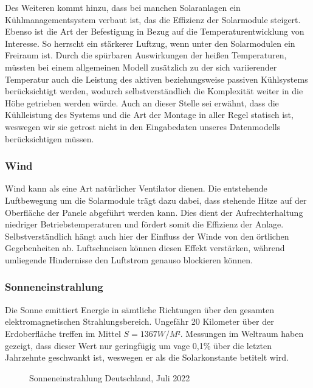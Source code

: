 \documentclass[12pt, a4paper]{article}
\begin{document}
Des Weiteren kommt hinzu, dass bei manchen Solaranlagen ein Kühlmanagementsystem verbaut ist, das die Effizienz der Solarmodule steigert. Ebenso ist die Art der Befestigung in Bezug auf die Temperaturentwicklung von Interesse. So herrscht ein stärkerer Luftzug, wenn unter den Solarmodulen ein Freiraum ist. Durch die spürbaren Auswirkungen der heißen Temperaturen, müssten bei einem allgemeinen Modell zusätzlich zu der sich variierender Temperatur auch die Leistung des aktiven beziehungsweise passiven Kühlsystems berücksichtigt werden, wodurch selbstverständlich die Komplexität weiter in die Höhe getrieben werden würde. Auch an dieser Stelle sei erwähnt, dass die Kühlleistung des Systems und die Art der Montage in aller Regel statisch ist, weswegen wir sie getrost nicht in den Eingabedaten unseres Datenmodells berücksichtigen müssen.

\subsubsection{Wind}

Wind kann als eine Art natürlicher Ventilator dienen. Die entstehende Luftbewegung um die Solarmodule trägt dazu dabei, dass stehende Hitze auf der Oberfläche der Panele abgeführt werden kann. Dies dient der Aufrechterhaltung niedriger Betriebstemperaturen und fördert somit die Effizienz der Anlage. Selbstverständlich hängt auch hier der Einfluss der Winde von den örtlichen Gegebenheiten ab. Luftschneisen können diesen Effekt verstärken, während umliegende Hindernisse den Luftstrom genauso blockieren können.

\subsubsection{Sonneneinstrahlung}

Die Sonne emittiert Energie in sämtliche Richtungen über den gesamten elektromagnetischen Strahlungsbereich. Ungefähr 20 Kilometer über der Erdoberfläche treffen im Mittel $S = 1367 W/M²$. Messungen im Weltraum haben gezeigt, dass dieser Wert nur geringfügig um vage 0,1\% über die letzten Jahrzehnte geschwankt ist, weswegen er als die Solarkonstante betitelt wird. 

\begin{figure}
\centering
\def\svgwidth{350pt}

\caption{Sonneneinstrahlung Deutschland, Juli 2022}
\label{fig:sonneneinstrahlung}
\end {figure}
\end{document}
